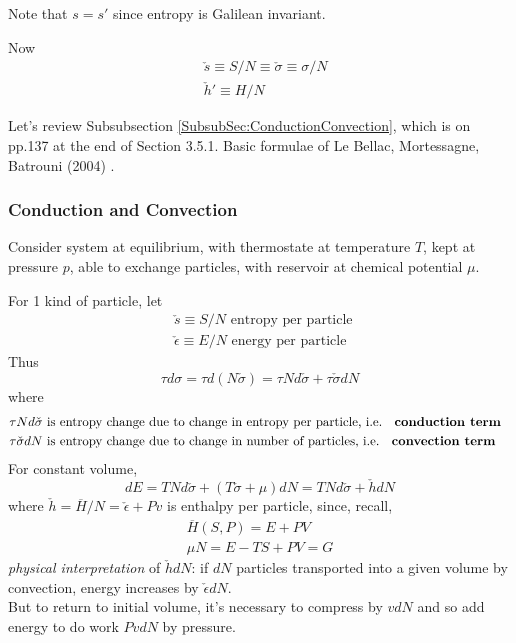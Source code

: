\documentclass[10pt]{amsart}
\begin{document}
\begin{multicols*}{2}
\begin{enumerate}
Note that $s=s'$ since entropy is Galilean invariant.  

Now
\[
\begin{aligned}
  & \check{s} \equiv S/N \equiv \check{\sigma} \equiv \sigma /N \\ 
  &  \check{h}' \equiv H/N
\end{aligned}
\]




Let's review Subsubsection \ref{SubsubSec:ConductionConvection}, which is on pp.137 at the end of Section 3.5.1. Basic formulae of Le Bellac, Mortessagne, Batrouni (2004) \cite{MLeBellacFMortessagneGBatrouni2004}.  

\subsubsection{Conduction and Convection}

Consider system at equilibrium, with thermostate at temperature $T$, kept at pressure $p$, able to exchange particles, with reservoir at chemical potential $\mu$.  

For 1 kind of particle, let 
\[
\begin{aligned}
  & \check{s} \equiv S/N \text{ entropy per particle } \\ 
  & \check{\epsilon} \equiv E/N \text{ energy per particle }
\end{aligned}
\]
Thus
\[
\tau d\sigma = \tau d(N \check{\sigma}) = \tau N d\check{\sigma} + \tau \check{\sigma} dN
\]
where 
\[
\begin{aligned}
  & \tau N d\check{\sigma} \text{ is entropy change due to change in entropy per particle, i.e. \textbf{ conduction term } } \\
  & \tau \check{\sigma} dN \text{ is entropy change due to change in number of particles, i.e. \textbf{ convection term } }
\end{aligned}
\]
For constant volume,
\[
dE = TN d\check{\sigma} + (T\check{\sigma} +\mu)dN = TN d\check{\sigma} + \check{h} dN
\]
where $\check{h} = \overline{H}/N = \check{\epsilon} + Pv$ is enthalpy per particle, since, recall,
\[
\begin{gathered}
  \overline{H}(S,P) = E+ PV \\ 
  \mu N = E-TS + PV =G
\end{gathered}
\]
\emph{physical interpretation} of $\check{h}dN$: if $dN$ particles transported into a given volume by convection, 
energy increases by $\check{\epsilon}dN$.  \\
 But to return to initial volume, it's necessary to compress by $vdN$ and so add energy to do work $PvdN$ by pressure.


\end{enumerate}
\end{multicols*}
\end{document}
